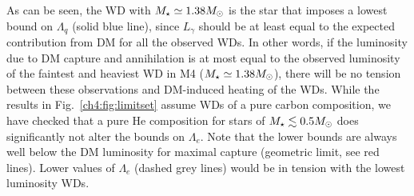 As can be seen, the WD with $M_\star\simeq1.38 M_\odot$ is the star that imposes a lowest bound on $\Lambda_q$ (solid blue line), since  $L_\gamma$ should be at least equal to the expected contribution from DM for all the observed WDs. 
In other words, if the luminosity due to DM capture and annihilation is at most equal to the observed luminosity of the faintest and heaviest WD in M4 ($M_\star\simeq1.38 M_\odot$), there will be no tension between these observations and DM-induced heating of the WDs. 
While the results in Fig.~\ref{ch4:fig:limitset} assume WDs of a pure carbon composition, we have checked that a pure He composition for stars of $M_\star\lesssim0.5M_\odot$ does significantly not alter the bounds on $\Lambda_e$. 
Note that the lower bounds are always well below the DM luminosity for maximal capture (geometric limit, see red lines). 
Lower values of $\Lambda_e$ (dashed grey lines) would be in tension with the lowest luminosity WDs. 




